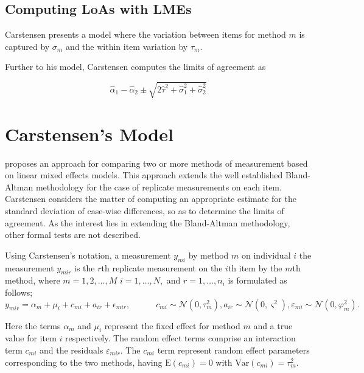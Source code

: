 \documentclass{report}
\begin{document}
\subsection{Computing LoAs with LMEs}


Carstensen presents a model where the variation between items for
method $m$ is captured by $\sigma_m$ and the within item variation
by $\tau_m$.

Further to his model, Carstensen computes the limits of agreement
as

\[
\hat{\alpha}_1 - \hat{\alpha}_2 \pm \sqrt{2 \hat{\tau}^2 +
	\hat{\sigma}^2_1 + \hat{\sigma}^2_2}
\]




\section{Carstensen's Model}
\citet{BXC2008} proposes an approach for comparing two or more methods of measurement based on linear mixed effects models. This approach extends the well established Bland-Altman methodology for the case of replicate measurements on each item. Carstensen considers the matter of computing an appropriate estimate for the standard deviation of case-wise differences, so as to determine the limits of agreement. As the interest lies in extending the Bland-Altman methodology, other formal tests are not described.

Using Carstensen's notation, a measurement $y_{mi}$ by method $m$ on individual $i$ the measurement $y_{mir} $ is the $r$th replicate measurement on the $i$th item by the $m$th method, where $m=1,2,\ldots,M$ $i=1,\ldots,N,$ and $r = 1,\ldots,n_i$ is formulated as follows;
\begin{equation}
	y_{mir}  = \alpha_{m} + \mu_{i} + c_{mi} + a_{ir} + \epsilon_{mir}, \qquad \quad c_{mi} \sim \mathcal{N}(0,\tau^{2}_{m}) , a_{ir} \sim \mathcal{N}(0,\varsigma^{2}),  \varepsilon_{mi} \sim \mathcal{N}(0,\varphi^{2}_{m}) .
\end{equation}

Here the terms $\alpha_{m}$ and $\mu_{i}$ represent the fixed effect for method $m$ and a true value for item $i$ respectively. The random effect terms comprise an interaction term $c_{mi}$ and the residuals $\varepsilon_{mir}$.
The $c_{mi}$ term represent random effect parameters corresponding to the two methods, having $\mathrm{E}(c_{mi})= 0$ with $\mathrm{Var}(c_{mi})=\tau^2_m$.  
\end{document}
